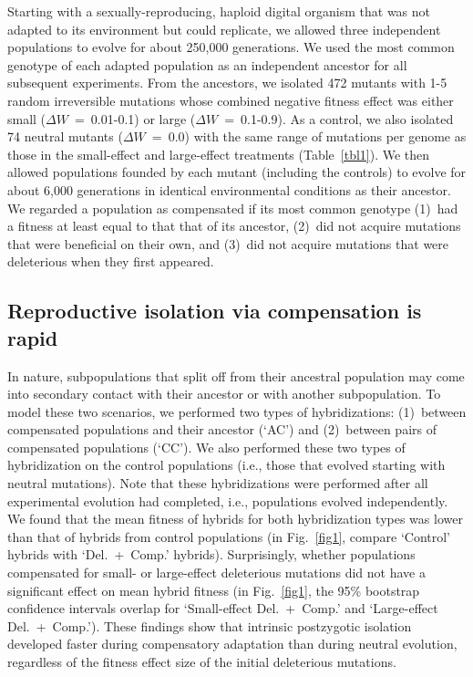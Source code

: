 \documentclass[11pt]{article}
\begin{document}
Starting with a sexually-reproducing, haploid digital organism
that was not adapted to its environment but could replicate,
we allowed three independent populations to evolve
for about 250,000 generations.
%
We used the most common genotype of each adapted population
as an independent ancestor for all subsequent experiments.
%
From the ancestors, we isolated 472 mutants
with 1-5 random irreversible mutations
whose combined negative fitness effect was either
small ($\Delta W$~=~0.01-0.1) or large ($\Delta W$~=~0.1-0.9).
%
As a control, we also isolated 74 neutral mutants ($\Delta W$~=~0.0)
with the same range of mutations per genome as those
in the small-effect and large-effect treatments (Table~\ref{tbl1}).
%
We then allowed populations founded by each mutant (including the controls)
to evolve for about 6,000 generations
in identical environmental conditions as their ancestor.
%
We regarded a population as compensated if its most common genotype
(1)~had a fitness at least equal to that that of its ancestor,
(2)~did not acquire mutations that were beneficial on their own, and
(3)~did not acquire mutations that were deleterious when they first appeared.



\subsection*{Reproductive isolation via compensation is rapid}

In nature, subpopulations that split off from their ancestral population may
come into secondary contact with their ancestor or with another subpopulation.
%
To model these two scenarios, we performed two types of hybridizations:
(1)~between compensated populations and their ancestor (`AC')
and (2)~between pairs of compensated populations (`CC').
%
We also performed these two types of hybridization on the control populations
(i.e., those that evolved starting with neutral mutations).
%
Note that these hybridizations were performed after all experimental evolution
had completed, i.e., populations evolved independently.
%
We found that the mean fitness of hybrids for both hybridization types
was lower than that of hybrids from control populations
(in Fig.~\ref{fig1}, compare `Control' hybrids with `Del.~+~Comp.' hybrids).
%
Surprisingly, whether populations compensated for
small- or large-effect deleterious mutations
did not have a significant effect on mean hybrid fitness
(in Fig.~\ref{fig1}, the 95\% bootstrap confidence intervals overlap for
`Small-effect Del.~+~Comp.' and `Large-effect Del.~+~Comp.').
%
These findings show that intrinsic postzygotic isolation developed faster
during compensatory adaptation than during neutral evolution,
regardless of the fitness effect size of the initial deleterious mutations.
\end{document}
